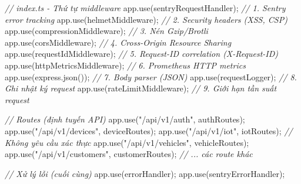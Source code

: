 \documentclass[13pt,a4paper]{extarticle}
\newenvironment{Shaded}{}{}
\newcommand{\CommentTok}[1]{\textcolor[rgb]{0.38,0.63,0.69}{\textit{#1}}}
\newcommand{\FunctionTok}[1]{\textcolor[rgb]{0.02,0.16,0.49}{#1}}
\newcommand{\NormalTok}[1]{#1}
\newcommand{\OperatorTok}[1]{\textcolor[rgb]{0.40,0.40,0.40}{#1}}
\newcommand{\StringTok}[1]{\textcolor[rgb]{0.25,0.44,0.63}{#1}}
\renewcommand{\\}{\thesislongtableorignewline\hline}%
\begin{document}
\begin{Shaded}
\begin{Highlighting}[]
\CommentTok{// index.ts {-} Thứ tự middleware}
\NormalTok{app}\OperatorTok{.}\FunctionTok{use}\NormalTok{(sentryRequestHandler)}\OperatorTok{;} \CommentTok{// 1. Sentry error tracking}
\NormalTok{app}\OperatorTok{.}\FunctionTok{use}\NormalTok{(helmetMiddleware)}\OperatorTok{;} \CommentTok{// 2. Security headers (XSS, CSP)}
\NormalTok{app}\OperatorTok{.}\FunctionTok{use}\NormalTok{(compressionMiddleware)}\OperatorTok{;} \CommentTok{// 3. Nén Gzip/Brotli}
\NormalTok{app}\OperatorTok{.}\FunctionTok{use}\NormalTok{(corsMiddleware)}\OperatorTok{;} \CommentTok{// 4. Cross{-}Origin Resource Sharing}
\NormalTok{app}\OperatorTok{.}\FunctionTok{use}\NormalTok{(requestIdMiddleware)}\OperatorTok{;} \CommentTok{// 5. Request{-}ID correlation (X{-}Request{-}ID)}
\NormalTok{app}\OperatorTok{.}\FunctionTok{use}\NormalTok{(httpMetricsMiddleware)}\OperatorTok{;} \CommentTok{// 6. Prometheus HTTP metrics}
\NormalTok{app}\OperatorTok{.}\FunctionTok{use}\NormalTok{(express}\OperatorTok{.}\FunctionTok{json}\NormalTok{())}\OperatorTok{;} \CommentTok{// 7. Body parser (JSON)}
\NormalTok{app}\OperatorTok{.}\FunctionTok{use}\NormalTok{(requestLogger)}\OperatorTok{;} \CommentTok{// 8. Ghi nhật ký request}
\NormalTok{app}\OperatorTok{.}\FunctionTok{use}\NormalTok{(rateLimitMiddleware)}\OperatorTok{;} \CommentTok{// 9. Giới hạn tần suất request}

\CommentTok{// Routes (định tuyến API)}
\NormalTok{app}\OperatorTok{.}\FunctionTok{use}\NormalTok{(}\StringTok{"/api/v1/auth"}\OperatorTok{,}\NormalTok{ authRoutes)}\OperatorTok{;}
\NormalTok{app}\OperatorTok{.}\FunctionTok{use}\NormalTok{(}\StringTok{"/api/v1/devices"}\OperatorTok{,}\NormalTok{ deviceRoutes)}\OperatorTok{;}
\NormalTok{app}\OperatorTok{.}\FunctionTok{use}\NormalTok{(}\StringTok{"/api/v1/iot"}\OperatorTok{,}\NormalTok{ iotRoutes)}\OperatorTok{;} \CommentTok{// Không yêu cầu xác thực}
\NormalTok{app}\OperatorTok{.}\FunctionTok{use}\NormalTok{(}\StringTok{"/api/v1/vehicles"}\OperatorTok{,}\NormalTok{ vehicleRoutes)}\OperatorTok{;}
\NormalTok{app}\OperatorTok{.}\FunctionTok{use}\NormalTok{(}\StringTok{"/api/v1/customers"}\OperatorTok{,}\NormalTok{ customerRoutes)}\OperatorTok{;}
\CommentTok{// ... các route khác}

\CommentTok{// Xử lý lỗi (cuối cùng)}
\NormalTok{app}\OperatorTok{.}\FunctionTok{use}\NormalTok{(errorHandler)}\OperatorTok{;}
\NormalTok{app}\OperatorTok{.}\FunctionTok{use}\NormalTok{(sentryErrorHandler)}\OperatorTok{;}
\end{Highlighting}
\end{Shaded}
\end{document}
